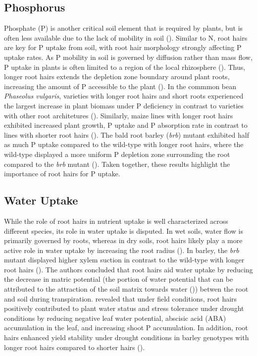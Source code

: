 \documentclass{article}
\begin{document}
\subsection{Phosphorus}
Phosphate (P) is another critical soil element that is required by plants,
but is often less available due to the lack of mobility in soil (\cite{bienert_root_2021}).
Similar to N, root hairs are key for P uptake from soil, with root hair morphology
strongly affecting P uptake rates. As P mobility in soil is governed by
diffusion rather than mass flow, P uptake in plants is often limited to a region
of the local rhizosphere (\cite{barber_mechanisms_1963}). Thus, longer root hairs
extends the depletion zone boundary around plant roots, increasing the
amount of P accessible to the plant (\cite{bienert_root_2021}). In the commmon
bean \textit{Phaseolus vulgaris}, varieties with longer root hairs and short
roots experienced the largest increase in plant biomass under P deficiency in
contrast to varieties with other root architetures (\cite{miguel_phene_2015}).
Similarly, maize lines with longer root hairs exhibited increased plant growth,
P uptake and P absorption rate in contrast to lines with shorter root hairs
(\cite{zhu_utility_2010}). The bald root barley (\textit{brb}) mutant
exhibited half as much P uptake compared to the wild-type with longer root
hairs, where the wild-type displayed a more uniform P depletion zone surrounding
the root compared to the \textit{brb} mutant (\cite{gahoonia_barley_2004}).
Taken together, these results highlight the importance of root hairs for P uptake.

\subsection{Water Uptake}
While the role of root hairs in nutrient uptake is well characterized across different species, its role in water uptake is disputed. In wet soils, water flow is primarily governed by roots, whereas in dry soils, root hairs likely play a more active role in water uptake by increasing the root radius (\cite{cai_root_2022}). In barley, the \textit{brb} mutant displayed higher xylem suction in contrast to the wild-type with longer root hairs (\cite{carminati_root_2017}). The authors concluded that root hairs aid water uptake by reducing the decrease in matric potential (the portion of water potential that can be attributed to the attraction of the soil matrix towards water (\cite{kirkham_principles_2014})) betwen the root and soil during transpiration. \cite{marin_significance_2021} revealed that under field conditions, root hairs positively contributed to plant water status and stress tolerance under drought conditions by reducing negative leaf water potential, abscisic acid (ABA) accumulation in the leaf, and increasing shoot P accumulation. In addition, root hairs enhanced yield stability under drought conditions in barley genotypes with longer root hairs compared to shorter hairs (\cite{marin_significance_2021}).
\end{document}
